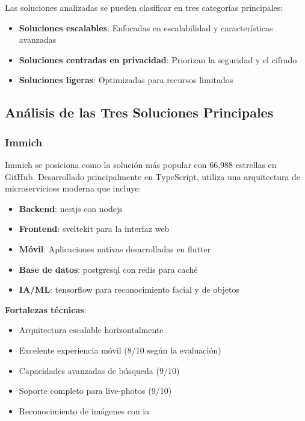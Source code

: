 Las soluciones analizadas se pueden clasificar en tres categorías principales:
\begin{itemize}
    \item \textbf{Soluciones escalables}: Enfocadas en escalabilidad y características avanzadas
    \item \textbf{Soluciones centradas en privacidad}: Priorizan la seguridad y el cifrado
    \item \textbf{Soluciones ligeras}: Optimizadas para recursos limitados
\end{itemize}

\subsection{Análisis de las Tres Soluciones Principales}

\subsubsection{Immich}

Immich se posiciona como la solución más popular con 66,988 estrellas en GitHub. Desarrollado principalmente en TypeScript, utiliza una arquitectura de \glspl{microservicios} moderna que incluye:

\begin{itemize}
    \item \textbf{Backend}: \gls{nestjs} con \gls{nodejs}
    \item \textbf{Frontend}: \gls{sveltekit} para la interfaz web
    \item \textbf{Móvil}: Aplicaciones nativas desarrolladas en \gls{flutter}
    \item \textbf{Base de datos}: \gls{postgresql} con \gls{redis} para caché
    \item \textbf{IA/ML}: \gls{tensorflow} para reconocimiento facial y de objetos
\end{itemize}

\textbf{Fortalezas técnicas}:
\begin{itemize}
    \item Arquitectura escalable horizontalmente
    \item Excelente experiencia móvil (8/10 según la evaluación)
    \item Capacidades avanzadas de búsqueda (9/10)
    \item Soporte completo para \gls{live-photos} (9/10)
    \item Reconocimiento de imágenes con \acrshort{ia}
\end{itemize}

